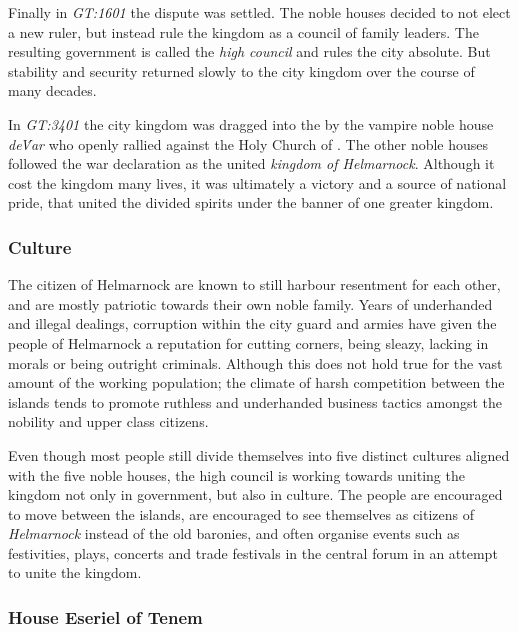 Finally in \emph{GT:1601} the dispute was settled. The noble houses decided
to not elect a new ruler, but instead rule the kingdom as a council of family
leaders. The resulting government is called the \emph{high council} and rules
the city absolute. But stability and security returned slowly to the city
kingdom over the course of many decades.

In \emph{GT:3401} the city kingdom was dragged into the
 by the vampire noble house \emph{de\'Var} who openly
rallied against the Holy Church of . The other noble
houses followed the war declaration as the united \emph{kingdom of
  Helmarnock}. Although it cost the kingdom many lives, it was ultimately a
victory and a source of national pride, that united the divided spirits under
the banner of one greater kingdom.

\subsubsection{Culture}


The citizen of Helmarnock are known to still harbour resentment for each other,
and are mostly patriotic towards their own noble family. Years of underhanded
and illegal dealings, corruption within the city guard and armies have given
the people of Helmarnock a reputation for cutting corners, being sleazy,
lacking in morals or being outright criminals. Although this does not hold
true for the vast amount of the working population; the climate of harsh
competition between the islands tends to promote ruthless and underhanded
business tactics amongst the nobility and upper class citizens.

Even though most people still divide themselves into five distinct cultures
aligned with the five noble houses, the high council is working towards
uniting the kingdom not only in government, but also in culture. The people
are encouraged to move between the islands, are encouraged to see themselves
as citizens of \emph{Helmarnock} instead of the old baronies, and often organise
events such as festivities, plays, concerts and trade festivals in the central
forum in an attempt to unite the kingdom.

\subsubsection{House Eseriel of Tenem}
\label{sec:House Eseriel}

